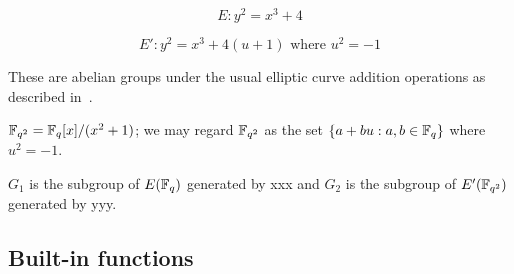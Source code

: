 $$
E: y^2 = x^3 + 4
$$

$$
E': y^2 = x^3 + 4(u+1) \mbox{ where $u^2=-1$}
$$

These are abelian groups under the usual elliptic curve addition operations as
described in~\cite[III.2]{Silverman-Arithmetic-EC}.

$\mathbb{F}_{q^2} = \mathbb{F}_q[x]/(x^2+1)$; we may regard $\mathbb{F}_{q^2}$ as the set $\{a+bu: a,b \in \mathbb{F}_q\}$ where $u^2=-1$.

$G_1$ is the subgroup of $E(\mathbb{F}_q)$ generated by xxx and $G_2$ is the subgroup of $E'(\mathbb{F}_{q^2})$ generated by yyy.






\subsection{Built-in functions}
\label{sec:future-built-in-functions}

